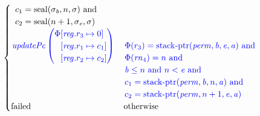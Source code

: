 \documentclass[a4paper]{article}
\begin{document}
\begin{align*}
\begin{cases}
\begin{array}[t]{l}
                                   c_1 = \seal{\sigma_\baddr,n,\sigma} \tand \\
                                   c_2 = \seal{n+1,\sigma_\eaddr,\sigma}
                                 \end{array}\\
                                   \sourcecolor\left.
                                   \updPcAddr{}\left(
                                   \arraycolsep=0pt
                                   \begin{array}{rl}
                                     \Phi&\updReg{r_3}{0}\\
                                               &\updReg{r_1}{c_1}\\
                                               &\updReg{r_2}{c_2}
                                   \end{array} \right)\right.
&
                                 \sourcecolor\left.
                                 \arraycolsep=0pt
                                 \begin{array}[t]{l}
                                   \Phi(r_3) = \stkptr{\perm,\baddr,\eaddr,\aaddr} \tand \\
                                   \Phi(\rn_4) = n \tand \\
                                   \baddr \leq n \tand n < \eaddr \tand \\
                                   c_1 = \stkptr{\perm,\baddr,n,\aaddr} \tand \\
                                   c_2 = \stkptr{\perm,n+1,\eaddr,\aaddr}
                                 \end{array} \right.\\
                                 \failed & \totherwise
                               \end{cases}
\end{align*}
\end{document}
